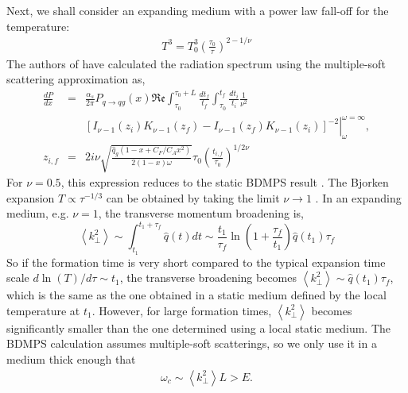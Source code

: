 \documentclass[aps, prc, reprint, amsmath, groupedaddress, nofootinbib]{revtex4-1}
\begin{document}
Next, we shall consider an expanding medium with a power law fall-off for the temperature: 
\begin{eqnarray}
T^3 = T_0^3\left(\frac{\tau_0}{\tau}\right)^{2-1/\nu}
\end{eqnarray}
The authors of \cite{Baier:1998yf} have calculated the radiation spectrum using the multiple-soft scattering approximation as,
\begin{eqnarray}
\frac{dP}{dx} &=& \frac{\alpha_s}{2\pi}P_{q\rightarrow qg}(x)\mathfrak{Re}\int_{\tau_0}^{\tau_0+L}\frac{dt_f}{t_f}\int_{\tau_0}^{t_f}\frac{dt_i}{t_i} \frac{1}{\nu^2}\\
\nonumber
&& \left.\left[ I_{\nu-1}(z_i)K_{\nu-1}(z_f)-I_{\nu-1}(z_f)K_{\nu-1}(z_i)\right]^{-2}\right|_{\omega}^{\omega=\infty},\\
z_{i,f} &=& 2i\nu \sqrt{\frac{\hat{q}_g(1-x+C_F/C_A x^2)}{2(1-x)\omega}} \tau_0 \left( \frac{t_{i,f}}{\tau_0}\right) ^{1/2\nu}
\end{eqnarray}
For $\nu=0.5$, this expression reduces to the static BDMPS result \cite{Baier:1996kr}. 
The Bjorken expansion $T \propto \tau^{-1/3}$ can be obtained by taking the limit $\nu \rightarrow 1$ \cite{PhysRevD.27.140}.
In an expanding medium, e.g. $\nu=1$, the transverse momentum broadening is,
\begin{equation}\label{eq:expanding-kt2}
\left\langle k_\perp^2\right\rangle \sim \int_{t_1}^{t_1+\tau_f
}\hat{q}(t)dt \sim \frac{t_1}{\tau_f}  \ln\left(1+\frac{\tau_f}{t_1}\right) \hat{q}(t_1)\tau_f
\end{equation}
So if the formation time is very short compared to the typical expansion time scale $d\ln(T)/d\tau \sim t_1$, the transverse broadening becomes $\left\langle k_\perp^2\right\rangle \sim \hat{q}(t_1)\tau_f$, which is the same as the one obtained in a static medium defined by the local temperature at $t_1$.
However, for large formation times, $\left\langle k_\perp^2\right\rangle$ becomes significantly smaller than the one determined using a local static medium.
The BDMPS calculation assumes multiple-soft scatterings, so we only use it in a medium thick enough that
\begin{eqnarray}\label{eq:BDMPS-requrement}
\omega_c \sim \left\langle k_\perp^2 \right\rangle L > E.
\end{eqnarray}
\end{document}
